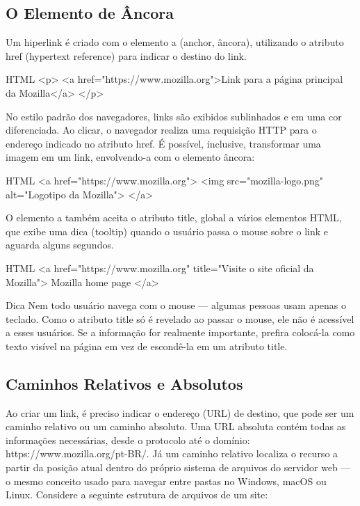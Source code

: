 \subsection{O Elemento de Âncora}

Um hiperlink é criado com o elemento a (anchor, âncora), utilizando o atributo href (hypertext reference) para indicar o destino do link.

\begin{codebox}{HTML}
 <p>
   <a href="https://www.mozilla.org">Link para a página principal da Mozilla</a>
 </p>
\end{codebox}

No estilo padrão dos navegadores, links são exibidos sublinhados e em uma cor diferenciada. Ao clicar, o navegador realiza uma requisição HTTP para o endereço indicado no atributo href. É possível, inclusive, transformar uma imagem em um link, envolvendo-a com o elemento âncora:

\begin{codebox}{HTML}
<a href="https://www.mozilla.org">
  <img src="mozilla-logo.png" alt="Logotipo da Mozilla">
</a>
\end{codebox}

O elemento a também aceita o atributo title, global a vários elementos HTML, que exibe uma dica (tooltip) quando o usuário passa o mouse sobre o link e aguarda alguns segundos.

\begin{codebox}{HTML}
<a href="https://www.mozilla.org" title="Visite o site oficial da Mozilla">
  Mozilla home page
</a>
\end{codebox}

\begin{infobox}{Dica}
Nem todo usuário navega com o mouse — algumas pessoas usam apenas o teclado. Como o atributo title só é revelado ao passar o mouse, ele não é acessível a esses usuários. Se a informação for realmente importante, prefira colocá-la como texto visível na página em vez de escondê-la em um atributo title.
\end{infobox}

\subsection{Caminhos Relativos e Absolutos}

Ao criar um link, é preciso indicar o endereço (URL) de destino, que pode ser um caminho relativo ou um caminho absoluto. Uma URL absoluta contém todas as informações necessárias, desde o protocolo até o domínio: https://www.mozilla.org/pt-BR/. Já um caminho relativo localiza o recurso a partir da posição atual dentro do próprio sistema de arquivos do servidor web — o mesmo conceito usado para navegar entre pastas no Windows, macOS ou Linux. Considere a seguinte estrutura de arquivos de um site:

